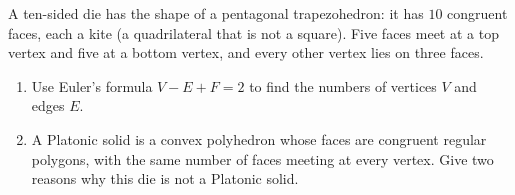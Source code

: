 A ten-sided die has the shape of a pentagonal trapezohedron: it has $10$ congruent faces, each a kite (a quadrilateral that is not a square). Five faces meet at a top vertex and five at a bottom vertex, and every other vertex lies on three faces.
\begin{enumerate}
\item[(a)] Use Euler's formula $V-E+F=2$ to find the numbers of vertices $V$ and edges $E$.
\item[(b)] A Platonic solid is a convex polyhedron whose faces are congruent regular polygons, with the same number of faces meeting at every vertex. Give two reasons why this die is not a Platonic solid.
\end{enumerate}
